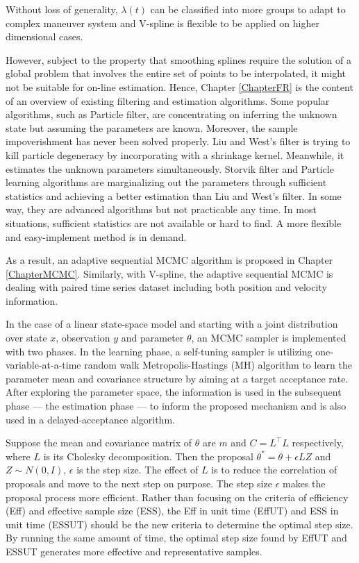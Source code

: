 Without loss of generality, $\lambda(t)$ can be classified into more groups to adapt to complex maneuver system and V-spline is flexible to be applied on higher dimensional cases. 

However, subject to the property that smoothing splines require the solution of a global problem that involves the entire set of points to be interpolated, it might not be suitable for on-line estimation. Hence, Chapter \ref{ChapterFR} is the content of an overview of existing filtering and estimation algorithms. Some popular algorithms, such as Particle filter, are concentrating on inferring the unknown state but assuming the parameters are known. Moreover, the sample impoverishment has never been solved properly. Liu and West's filter is trying to kill particle degeneracy by incorporating with a shrinkage kernel. Meanwhile, it estimates the unknown parameters simultaneously. Storvik filter and Particle learning algorithms are marginalizing out the parameters through sufficient statistics and achieving a better estimation than Liu and West's filter. In some way, they are advanced algorithms but not practicable any time. In most situations, sufficient statistics are not available or hard to find. A more flexible and easy-implement method is in demand. 
 
As a result, an adaptive sequential MCMC algorithm is proposed in Chapter \ref{ChapterMCMC}. Similarly, with V-spline, the adaptive sequential MCMC is dealing with paired time series dataset including both position and velocity information. 

In the case of a linear state-space model and starting with a joint distribution over state $x$, observation $y$ and parameter $\theta$, an MCMC sampler is implemented with two phases. In the learning phase, a self-tuning sampler is utilizing one-variable-at-a-time random walk Metropolis-Hastings (MH) algorithm to learn the parameter mean and covariance structure by aiming at a target acceptance rate. After exploring the parameter space, the information is used in the subsequent phase --- the estimation phase --- to inform the proposed mechanism and is also used in a delayed-acceptance algorithm. 

Suppose the mean and covariance matrix of $\theta$ are $m$ and $C=L^\top L$ respectively, where $L$ is its Cholesky decomposition. Then the proposal $\theta^*=\theta + \epsilon LZ$ and $Z\sim N(0,I)$, $\epsilon$ is the step size. The effect of $L$ is to reduce the correlation of proposals and move to the next step on purpose. The step size $\epsilon$ makes the proposal process more efficient. Rather than focusing on the criteria of efficiency (Eff) and effective sample size (ESS), the Eff in unit time (EffUT) and ESS in unit time (ESSUT) should be the new criteria to determine the optimal step size. By running the same amount of time, the optimal step size found by EffUT and ESSUT generates more effective and representative samples. 

